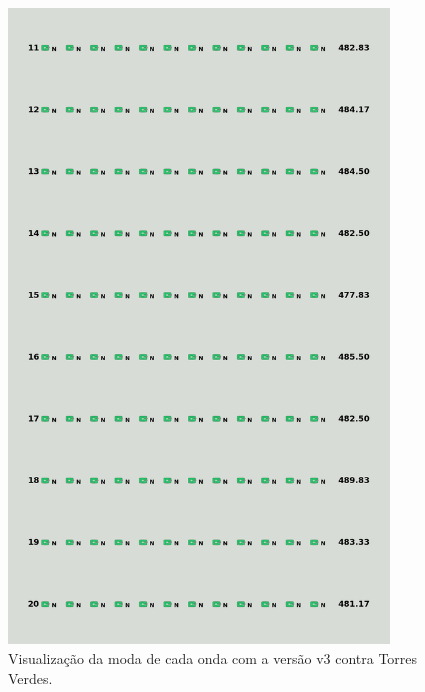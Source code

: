 \begin{figure}[H]
  \centering
  \includegraphics[width=0.9\textwidth]{figuras/td/td_allgreen_ai_mode_3_2.png}
  \caption{Visualização da moda de cada onda com a versão v3 contra Torres Verdes.}
  \label{fig:td-moda-green-3-2}
\end{figure}

